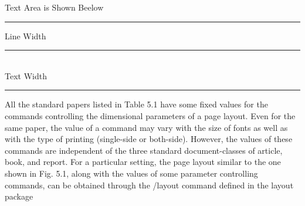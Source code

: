\documentclass[a4paper]{article}
\begin{document}
\centering %

Text Area is Shown Beelow
\rule{\textwidth}{\textheight}

Line Width
\rule{\linewidth}{1pt} %
\\[20pt]
Text Width
\rule{\textwidth}{1pt}


\newpage
\Large
All the standard papers listed in Table 5.1 have some fixed values for the commands controlling the dimensional parameters of a page layout. 
Even for the same paper, the value of a command may vary with the size of fonts as well as with the type of printing (single-side or both-side). 
However, the values of these commands are independent of the three standard document-classes of article, book, and report. For a particular setting, 
the page layout similar to the one shown in Fig. 5.1, along with the values of some parameter controlling commands, can be obtained through the 
/layout command defined in the layout package
\end{document}
